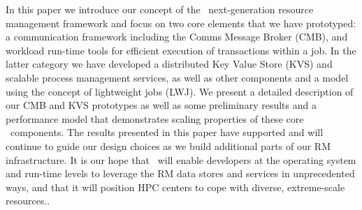 In this paper we introduce our concept of the \flux\ next-generation
resource management framework
and focus on two core elements that we have prototyped: a
communication framework including the Comms Message Broker (CMB), and
workload
run-time tools for efficient execution of transactions within a job. In the
latter category we have developed a distributed Key Value Store (KVS) and
scalable process management services, as well as other components and a
model
using the concept of lightweight jobs (LWJ).
We present a detailed description of our CMB and KVS prototypes
as well as some preliminary results and a performance model that
demonstrates scaling properties of these core \flux\ components.
The results presented in this paper have supported and will continue to guide our design
choices as we build additional parts of our RM infrastructure.
It is our hope that \flux\ will enable developers at the operating system and
run-time levels to leverage the RM data stores and services in
unprecedented ways, and that it will position HPC centers to cope
with diverse, extreme-scale resources..
